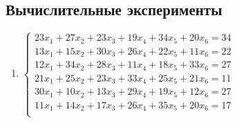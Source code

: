 \documentclass[14pt, a4paper]{extarticle}
\begin{document}
	\subsection{Вычислительные эксперименты}
		\begin{enumerate}
			 \item $\begin{cases}
			 			23x_1 + 27x_2 + 23x_3 + 19x_4 + 34x_5 + 20x_6 = 34\\
			 			13x_1 + 15x_2 + 30x_3 + 26x_4 + 22x_5 + 11x_6 = 22\\
			 			12x_1 + 34x_2 + 28x_3 + 11x_4 + 18x_5 + 33x_6 = 27\\
			 			21x_1 + 25x_2 + 23x_3 + 33x_4 + 25x_5 + 21x_6 = 11\\
			 			30x_1 + 10x_2 + 13x_3 + 29x_4 + 19x_5 + 12x_6 = 27\\
			 			11x_1 + 14x_2 + 17x_3 + 26x_4 + 35x_5 + 20x_6 = 17\\
			 		\end{cases}$
		 		

\end{enumerate}
\end{document}
